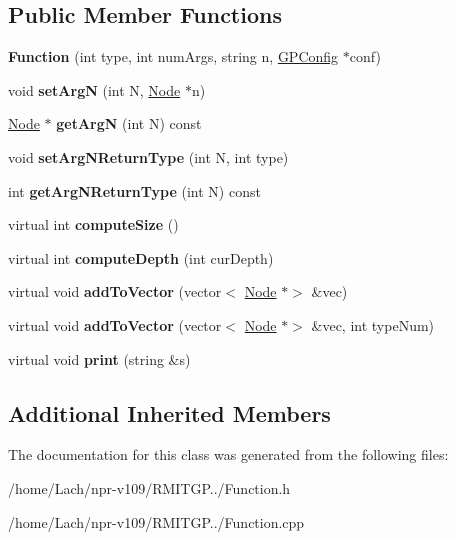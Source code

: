 \subsection*{Public Member Functions}
\begin{DoxyCompactItemize}
\item 
\hypertarget{classFunction_ac6ace12b3f85a5cc3cbac74d689a4c97}{}\label{classFunction_ac6ace12b3f85a5cc3cbac74d689a4c97} 
{\bfseries Function} (int type, int num\+Args, string n, \hyperlink{classGPConfig}{G\+P\+Config} $\ast$conf)
\item 
\hypertarget{classFunction_a8c700b4566ed38a2e0a2e43298006562}{}\label{classFunction_a8c700b4566ed38a2e0a2e43298006562} 
void {\bfseries set\+ArgN} (int N, \hyperlink{classNode}{Node} $\ast$n)
\item 
\hypertarget{classFunction_a7f59d12d6f9c025f624c8e7a3ba4ab50}{}\label{classFunction_a7f59d12d6f9c025f624c8e7a3ba4ab50} 
\hyperlink{classNode}{Node} $\ast$ {\bfseries get\+ArgN} (int N) const
\item 
\hypertarget{classFunction_a81f92fe00fb304d3843d921621b9ea92}{}\label{classFunction_a81f92fe00fb304d3843d921621b9ea92} 
void {\bfseries set\+Arg\+N\+Return\+Type} (int N, int type)
\item 
\hypertarget{classFunction_a806fff8d1517a3ef7e747bd680e8f1bc}{}\label{classFunction_a806fff8d1517a3ef7e747bd680e8f1bc} 
int {\bfseries get\+Arg\+N\+Return\+Type} (int N) const
\item 
\hypertarget{classFunction_aa4e87ae2aa129545e59c7fbefa6ff30b}{}\label{classFunction_aa4e87ae2aa129545e59c7fbefa6ff30b} 
virtual int {\bfseries compute\+Size} ()
\item 
\hypertarget{classFunction_a147422c1eaa324d692fb6edf35da3a59}{}\label{classFunction_a147422c1eaa324d692fb6edf35da3a59} 
virtual int {\bfseries compute\+Depth} (int cur\+Depth)
\item 
\hypertarget{classFunction_a426a42cef2b34a808a079bdcb53d8e54}{}\label{classFunction_a426a42cef2b34a808a079bdcb53d8e54} 
virtual void {\bfseries add\+To\+Vector} (vector$<$ \hyperlink{classNode}{Node} $\ast$$>$ \&vec)
\item 
\hypertarget{classFunction_a78671c12f81c0eb3e0a54a4df9716b94}{}\label{classFunction_a78671c12f81c0eb3e0a54a4df9716b94} 
virtual void {\bfseries add\+To\+Vector} (vector$<$ \hyperlink{classNode}{Node} $\ast$$>$ \&vec, int type\+Num)
\item 
\hypertarget{classFunction_a2d8cbf61ef2fb349958b818f87fedd83}{}\label{classFunction_a2d8cbf61ef2fb349958b818f87fedd83} 
virtual void {\bfseries print} (string \&s)
\end{DoxyCompactItemize}
\subsection*{Additional Inherited Members}


The documentation for this class was generated from the following files\+:\begin{DoxyCompactItemize}
\item 
/home/\+Lach/npr-\/v109/\+R\+M\+I\+T\+G\+P../Function.\+h\item 
/home/\+Lach/npr-\/v109/\+R\+M\+I\+T\+G\+P../Function.\+cpp\end{DoxyCompactItemize}
